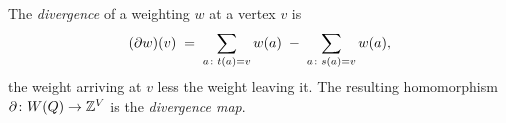 \begin{definition}[Divergence]\label{sh-0003}
The \emph{divergence} of a weighting $w$ at a vertex $v$ is
\begin{equation}\label{eq:divergence}
(\partial w)(v) \;=\; \sum_{a \colon t(a) = v} w(a) \;-\; \sum_{a \colon s(a) = v} w(a),
\end{equation}
the weight arriving at $v$ less the weight leaving it. The resulting homomorphism $\partial \colon W(Q) \to \mathbb{Z}^{V}$ is the \emph{divergence map}.
\end{definition}
